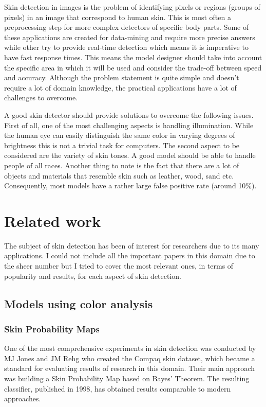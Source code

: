 \documentclass[12pt]{report}
\begin{document}
	Skin detection in images is the problem of identifying pixels or regions (groups of pixels) in an image that correspond to human skin. This is most often a preprocessing step for more complex detectors of specific body parts. Some of these applications are created for data-mining and require more precise answers while other try to provide real-time detection which means it is imperative to have fast response times. This means the model designer should take into account the specific area in which it will be used and consider the trade-off between speed and accuracy. Although the problem statement is quite simple and doesn't require a lot of domain knowledge, the practical applications have a lot of challenges to overcome.
	
	A good skin detector should provide solutions to overcome the following issues. First of all, one of the most challenging aspects is handling illumination. While the human eye can easily distinguish the same color in varying degrees of brightness this is not a trivial task for computers. The second aspect to be considered are the variety of skin tones. A good model should be able to handle people of all races. Another thing to note is the fact that there are a lot of objects and materials that resemble skin such as leather, wood, sand etc. Consequently, most models have a rather large false positive rate (around 10\%).
	
	\section{Related work}
	The subject of skin detection has been of interest for researchers due to its many applications. I could not include all the important papers in this domain due to the sheer number but I tried to cover the most relevant ones, in terms of popularity and results, for each aspect of skin detection.
	
	\subsection{Models using color analysis}
	
	\subsubsection{Skin Probability Maps}
	One of the most comprehensive experiments in skin detection was conducted by MJ Jones and JM Rehg\cite{compaq} who created the Compaq skin dataset, which became a standard for evaluating results of research in this domain. Their main approach was building a Skin Probability Map based on Bayes' Theorem. The resulting classifier, published in 1998, has obtained results comparable to modern approaches.
	
\end{document}
